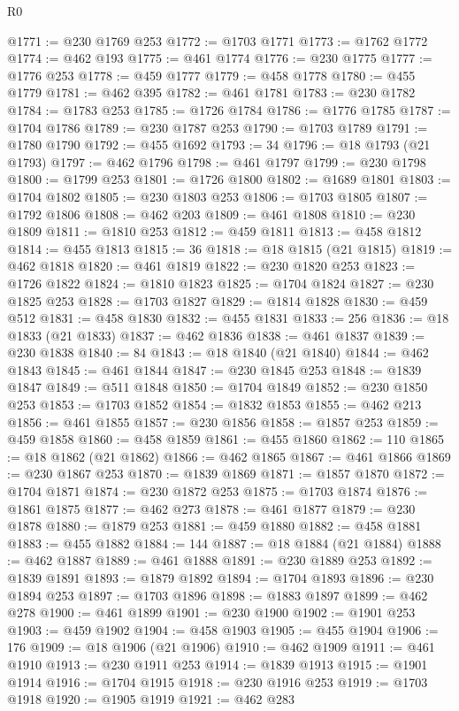 \begin{lexlean}{R0}
\begin{coremodule}
@1771 := @230 @1769 @253
@1772 := @1703 @1771
@1773 := @1762 @1772
@1774 := @462 @193
@1775 := @461 @1774
@1776 := @230 @1775
@1777 := @1776 @253
@1778 := @459 @1777
@1779 := @458 @1778
@1780 := @455 @1779
@1781 := @462 @395
@1782 := @461 @1781
@1783 := @230 @1782
@1784 := @1783 @253
@1785 := @1726 @1784
@1786 := @1776 @1785
@1787 := @1704 @1786
@1789 := @230 @1787 @253
@1790 := @1703 @1789
@1791 := @1780 @1790
@1792 := @455 @1692
@1793 := 34
@1796 := @18 @1793 (@21 @1793)
@1797 := @462 @1796
@1798 := @461 @1797
@1799 := @230 @1798
@1800 := @1799 @253
@1801 := @1726 @1800
@1802 := @1689 @1801
@1803 := @1704 @1802
@1805 := @230 @1803 @253
@1806 := @1703 @1805
@1807 := @1792 @1806
@1808 := @462 @203
@1809 := @461 @1808
@1810 := @230 @1809
@1811 := @1810 @253
@1812 := @459 @1811
@1813 := @458 @1812
@1814 := @455 @1813
@1815 := 36
@1818 := @18 @1815 (@21 @1815)
@1819 := @462 @1818
@1820 := @461 @1819
@1822 := @230 @1820 @253
@1823 := @1726 @1822
@1824 := @1810 @1823
@1825 := @1704 @1824
@1827 := @230 @1825 @253
@1828 := @1703 @1827
@1829 := @1814 @1828
@1830 := @459 @512
@1831 := @458 @1830
@1832 := @455 @1831
@1833 := 256
@1836 := @18 @1833 (@21 @1833)
@1837 := @462 @1836
@1838 := @461 @1837
@1839 := @230 @1838
@1840 := 84
@1843 := @18 @1840 (@21 @1840)
@1844 := @462 @1843
@1845 := @461 @1844
@1847 := @230 @1845 @253
@1848 := @1839 @1847
@1849 := @511 @1848
@1850 := @1704 @1849
@1852 := @230 @1850 @253
@1853 := @1703 @1852
@1854 := @1832 @1853
@1855 := @462 @213
@1856 := @461 @1855
@1857 := @230 @1856
@1858 := @1857 @253
@1859 := @459 @1858
@1860 := @458 @1859
@1861 := @455 @1860
@1862 := 110
@1865 := @18 @1862 (@21 @1862)
@1866 := @462 @1865
@1867 := @461 @1866
@1869 := @230 @1867 @253
@1870 := @1839 @1869
@1871 := @1857 @1870
@1872 := @1704 @1871
@1874 := @230 @1872 @253
@1875 := @1703 @1874
@1876 := @1861 @1875
@1877 := @462 @273
@1878 := @461 @1877
@1879 := @230 @1878
@1880 := @1879 @253
@1881 := @459 @1880
@1882 := @458 @1881
@1883 := @455 @1882
@1884 := 144
@1887 := @18 @1884 (@21 @1884)
@1888 := @462 @1887
@1889 := @461 @1888
@1891 := @230 @1889 @253
@1892 := @1839 @1891
@1893 := @1879 @1892
@1894 := @1704 @1893
@1896 := @230 @1894 @253
@1897 := @1703 @1896
@1898 := @1883 @1897
@1899 := @462 @278
@1900 := @461 @1899
@1901 := @230 @1900
@1902 := @1901 @253
@1903 := @459 @1902
@1904 := @458 @1903
@1905 := @455 @1904
@1906 := 176
@1909 := @18 @1906 (@21 @1906)
@1910 := @462 @1909
@1911 := @461 @1910
@1913 := @230 @1911 @253
@1914 := @1839 @1913
@1915 := @1901 @1914
@1916 := @1704 @1915
@1918 := @230 @1916 @253
@1919 := @1703 @1918
@1920 := @1905 @1919
@1921 := @462 @283

\end{coremodule}
\end{lexlean}
